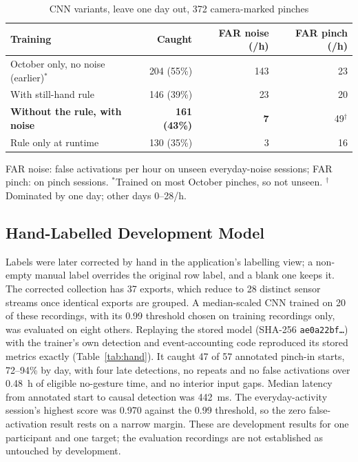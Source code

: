 \begin{table}[t]
  \centering
  \caption{CNN variants, leave one day out, 372 camera-marked pinches}
  \label{tab:lodo}
  \small
  \begin{tabular}{@{}lrrr@{}}
    \toprule
    Training & Caught & FAR noise (/h) & FAR pinch (/h) \\
    \midrule
    October only, no noise (earlier)$^\ast$ & 204 (55\%) & 143 & 23 \\
    With still-hand rule & 146 (39\%) & 23 & 20 \\
    \textbf{Without the rule, with noise} & \textbf{161 (43\%)} & \textbf{7} & 49$^\dagger$ \\
    Rule only at runtime & 130 (35\%) & 3 & 16 \\
    \bottomrule
  \end{tabular}\par\smallskip
  {\footnotesize FAR noise: false activations per hour on unseen everyday-noise sessions; FAR pinch: on pinch sessions.
  $^\ast$Trained on most October pinches, so not unseen. $^\dagger$Dominated by one day; other days 0--28/h.\par}
\end{table}

\subsection{Hand-Labelled Development Model}

Labels were later corrected by hand in the application's labelling view; a non-empty manual label overrides the original row label, and a blank one keeps it. The corrected collection has 37 exports, which reduce to 28 distinct sensor streams once identical exports are grouped. A median-scaled CNN trained on 20 of these recordings, with its 0.99 threshold chosen on training recordings only, was evaluated on eight others. Replaying the stored model (SHA-256 \texttt{ae0a22bf\ldots}) with the trainer's own detection and event-accounting code reproduced its stored metrics exactly (Table~\ref{tab:hand}). It caught 47 of 57 annotated pinch-in starts, 72--94\% by day, with four late detections, no repeats and no false activations over 0.48~h of eligible no-gesture time, and no interior input gaps. Median latency from annotated start to causal detection was 442~ms. The everyday-activity session's highest score was 0.970 against the 0.99 threshold, so the zero false-activation result rests on a narrow margin. These are development results for one participant and one target; the evaluation recordings are not established as untouched by development.

